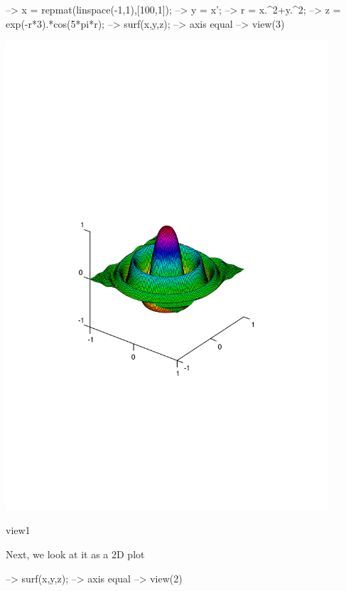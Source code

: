\begin{DoxyVerbInclude}
--> x = repmat(linspace(-1,1),[100,1]);
--> y = x';
--> r = x.^2+y.^2;
--> z = exp(-r*3).*cos(5*pi*r);
--> surf(x,y,z);
--> axis equal
--> view(3)
\end{DoxyVerbInclude}


 
\begin{DoxyImage}
\includegraphics[width=12cm]{view1}
\caption{view1}
\end{DoxyImage}
 Next, we look at it as a 2\-D plot


\begin{DoxyVerbInclude}
--> surf(x,y,z);
--> axis equal
--> view(2)
\end{DoxyVerbInclude}


